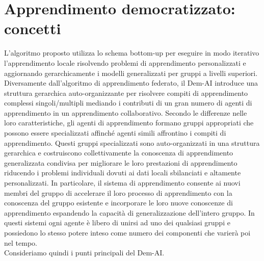 \chapter{Apprendimento democratizzato: concetti}\label{ch:chapter2}
L'algoritmo proposto utilizza lo schema bottom-up per eseguire in modo iterativo l'apprendimento locale risolvendo problemi di apprendimento personalizzati e aggiornando gerarchicamente i modelli generalizzati per gruppi a livelli superiori.\\
Diversamente dall'algoritmo di apprendimento federato, il Dem-AI introduce una struttura gerarchica auto-organizzante per risolvere compiti di apprendimento complessi singoli/multipli mediando i contributi di un gran numero di agenti di apprendimento in un apprendimento collaborativo. Secondo le differenze nelle loro caratteristiche, gli agenti di apprendimento formano gruppi appropriati che possono essere specializzati affinché agenti simili affrontino i compiti di apprendimento. Questi gruppi specializzati sono auto-organizzati in una struttura gerarchica e costruiscono collettivamente la conoscenza di apprendimento generalizzata condivisa per migliorare le loro prestazioni di apprendimento riducendo i problemi individuali dovuti ai dati locali sbilanciati e altamente personalizzati. In particolare, il sistema di apprendimento consente ai nuovi membri del gruppo di accelerare il loro processo di apprendimento con la conoscenza del gruppo esistente e incorporare le loro nuove conoscenze di apprendimento espandendo la capacità di generalizzazione dell'intero gruppo. In questi sistemi ogni agente è libero di unirsi ad uno dei qualsiasi gruppi e possiedono lo stesso potere inteso come numero dei componenti che varierà poi nel tempo.\\
Consideriamo quindi i punti principali del Dem-AI.
